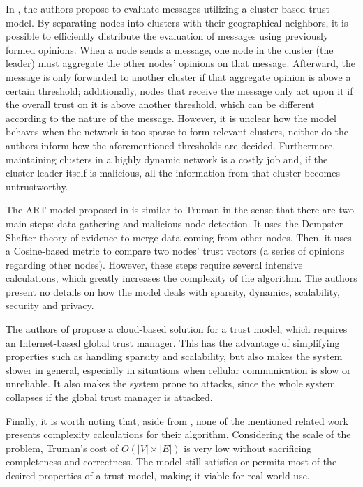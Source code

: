 \documentclass[conference]{IEEEtran}
\begin{document}
In \cite{chen2010trust}, the authors propose to evaluate messages utilizing a cluster-based trust model.
By separating nodes into clusters with their geographical neighbors, it is possible to efficiently distribute the evaluation of messages using previously formed opinions.
When a node sends a message, one node in the cluster (the leader) must aggregate the other nodes' opinions on that message.
Afterward, the message is only forwarded to another cluster if that aggregate opinion is above a certain threshold; additionally, nodes that receive the message only act upon it if the overall trust on it is above another threshold, which can be different according to the nature of the message.
However, it is unclear how the model behaves when the network is too sparse to form relevant clusters, neither do the authors inform how the aforementioned thresholds are decided.
Furthermore, maintaining clusters in a highly dynamic network is a costly job and, if the cluster leader itself is malicious, all the information from that cluster becomes untrustworthy.

The ART model proposed in \cite{li2016art} is similar to Truman in the sense that there are two main steps: data gathering and malicious node detection.
It uses the Dempster-Shafter theory of evidence to merge data coming from other nodes.
Then, it uses a Cosine-based metric to compare two nodes' trust vectors (a series of opinions regarding other nodes).
However, these steps require several intensive calculations, which greatly increases the complexity of the algorithm.
The authors present no details on how the model deals with sparsity, dynamics, scalability, security and privacy.

The authors of \cite{chen2017cloud} propose a cloud-based solution for a trust model, which requires an Internet-based global trust manager.
This has the advantage of simplifying properties such as handling sparsity and scalability, but also makes the system slower in general, especially in situations when cellular communication is slow or unreliable.
It also makes the system prone to attacks, since the whole system collapses if the global trust manager is attacked.

Finally, it is worth noting that, aside from \cite{vernize2015malicious}, none of the mentioned related work presents complexity calculations for their algorithm.
Considering the scale of the problem, Truman's cost of $O(|V|\times |E|)$ is very low without sacrificing completeness and correctness.
The model still satisfies or permits most of the desired properties of a trust model, making it viable for real-world use.
\end{document}
